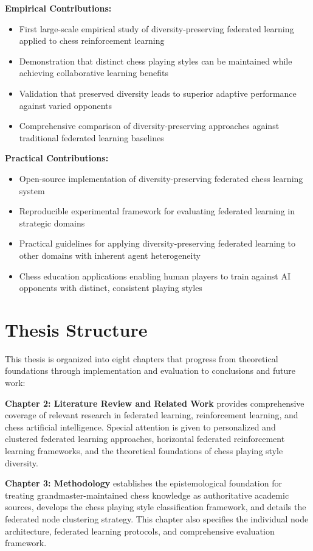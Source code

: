 \textbf{Empirical Contributions:}
\begin{itemize}
\item First large-scale empirical study of diversity-preserving federated learning applied to chess reinforcement learning
\item Demonstration that distinct chess playing styles can be maintained while achieving collaborative learning benefits
\item Validation that preserved diversity leads to superior adaptive performance against varied opponents
\item Comprehensive comparison of diversity-preserving approaches against traditional federated learning baselines
\end{itemize}

\textbf{Practical Contributions:}
\begin{itemize}
\item Open-source implementation of diversity-preserving federated chess learning system
\item Reproducible experimental framework for evaluating federated learning in strategic domains
\item Practical guidelines for applying diversity-preserving federated learning to other domains with inherent agent heterogeneity
\item Chess education applications enabling human players to train against AI opponents with distinct, consistent playing styles
\end{itemize}

\section{Thesis Structure}
\label{sec:structure}

This thesis is organized into eight chapters that progress from theoretical foundations through implementation and evaluation to conclusions and future work:

\textbf{Chapter 2: Literature Review and Related Work} provides comprehensive coverage of relevant research in federated learning, reinforcement learning, and chess artificial intelligence. Special attention is given to personalized and clustered federated learning approaches, horizontal federated reinforcement learning frameworks, and the theoretical foundations of chess playing style diversity.

\textbf{Chapter 3: Methodology} establishes the epistemological foundation for treating grandmaster-maintained chess knowledge as authoritative academic sources, develops the chess playing style classification framework, and details the federated node clustering strategy. This chapter also specifies the individual node architecture, federated learning protocols, and comprehensive evaluation framework.

